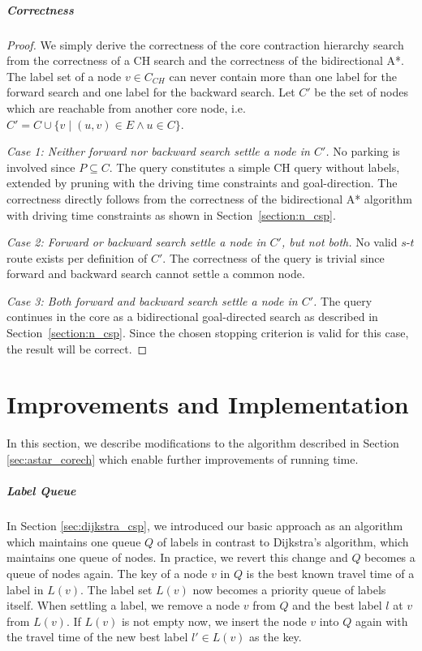 \subparagraph{Correctness}
\begin{proof}
	We simply derive the correctness of the core contraction hierarchy search from the correctness of a CH search and the correctness of the bidirectional A*. The label set of a node $v \in C_{CH}$ can never contain more than one label for the forward search and one label for the backward search. Let $C'$ be the set of nodes which are reachable from another core node, i.e. $C' = C \cup \{v \mid (u,v) \in E \wedge u \in C\}$.

	\emph{Case 1: Neither forward nor backward search settle a node in $C'$.} No parking is involved since $P \subseteq C$. The query constitutes a simple CH query without labels, extended by pruning with the driving time constraints and goal-direction. The correctness directly follows from the correctness of the bidirectional A* algorithm with driving time constraints as shown in Section~\ref{section:n_csp}.

	\emph{Case 2: Forward or backward search settle a node in $C'$, but not both.} No valid $s$-$t$ route exists per definition of $C'$. The correctness of the query is trivial since forward and backward search cannot settle a common node.

	\emph{Case 3: Both forward and backward search settle a node in $C'$.} The query continues in the core as a bidirectional goal-directed search as described in Section~\ref{section:n_csp}. Since the chosen stopping criterion is valid for this case, the result will be correct.
\end{proof}

\section{Improvements and Implementation\label{section:impl}}
In this section, we describe modifications to the algorithm described in Section \ref{sec:astar_corech} which enable further improvements of running time.

\subparagraph{Label Queue}
In Section \ref{sec:dijkstra_csp}, we introduced our basic approach as an algorithm which maintains one queue $Q$ of labels in contrast to Dijkstra's algorithm, which maintains one queue of nodes. In practice, we revert this change and $Q$ becomes a queue of nodes again. The key of a node $v$ in $Q$ is the best known travel time of a label in $L(v)$. The label set $L(v)$ now becomes a priority queue of labels itself. When settling a label, we remove a node $v$ from $Q$ and the best label $l$ at $v$ from $L(v)$. If $L(v)$ is not empty now, we insert the node $v$ into $Q$ again with the travel time of the new best label $l' \in L(v)$ as the key.

